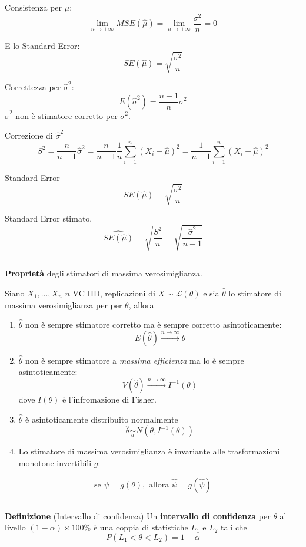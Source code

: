 \documentclass[
  11pt,
]{book}
\theoremstyle{mytheoremstyle}
\theoremstyle{mydefstyle}
\begin{document}
Consistenza per \(\mu\):
\[
  \lim_{n\to+\infty} MSE(\hat\mu) = \lim_{n\to+\infty} \frac {\sigma^2}n = 0
\]

E lo Standard Error:
\[SE(\hat\mu)=\sqrt{\frac {\sigma^2}n}\]

Correttezza per \(\hat\sigma^2\):
\[
  E(\hat\sigma^2) =  \frac {n-1}{n}\sigma^2
\]
\(\hat\sigma^2\) non è stimatore corretto per \(\sigma^2\).

Correzione di \(\hat\sigma^2\)
\[
  S^2=\frac{n}{n-1}\hat\sigma^2=\frac{n}{n-1}\frac{1}n\sum_{i=1}^n(X_i-\hat\mu)^2=\frac{1}{n-1}\sum_{i=1}^n(X_i-\hat\mu)^2
\]

Standard Error
\[SE(\hat\mu)=\sqrt{\frac {\sigma^2}n}\]

Standard Error stimato.
\[\widehat{SE(\hat\mu)}=\sqrt{\frac {S^2}n}=\sqrt{\frac {\hat\sigma^2}{n-1}}\]

\begin{center}\rule{0.5\linewidth}{0.5pt}\end{center}

\textbf{Proprietà} degli stimatori di massima verosimiglianza.

Siano \(X_1,...,X_n\) \(n\) VC IID, replicazioni di \(X\sim \mathscr{L}(\theta)\) e sia \(\hat\theta\) lo stimatore di massima verosimiglianza per per \(\theta\), allora

\begin{enumerate}
\def\labelenumi{\arabic{enumi}.}
\item
  \(\hat\theta\) non è sempre stimatore corretto ma è sempre corretto asintoticamente:
  \[E(\hat\theta)\xrightarrow{n\to\infty}\theta\]
\item
  \(\hat\theta\) non è sempre stimatore a \emph{massima efficienza} ma lo è sempre asintoticamente:
  \[V(\hat\theta)\xrightarrow{n\to\infty}I^{-1}(\theta)\]
  dove \(I(\theta)\) è l'infromazione di Fisher.
\item
  \(\hat\theta\) è asintoticamente distribuito normalmente
  \[\hat\theta\operatorname*{\sim}_a N(\theta,I^{-1}(\theta))\]
\item
  Lo stimatore di massima verosimiglianza è invariante alle trasformazioni monotone invertibili \(g\):
\end{enumerate}

\[ \text{se } \psi=g(\theta), \text{ allora } \hat\psi = g(\hat\psi)\]

\begin{center}\rule{0.5\linewidth}{0.5pt}\end{center}

\textbf{Definizione} (Intervallo di confidenza)
Un \textbf{intervallo di confidenza} per \(\theta\) al livello \((1-\alpha)\times 100\%\) è una coppia di statistiche \(L_1\) e \(L_2\) tali che
\[P(L_1<\theta<L_2)=1-\alpha\]
\end{document}
